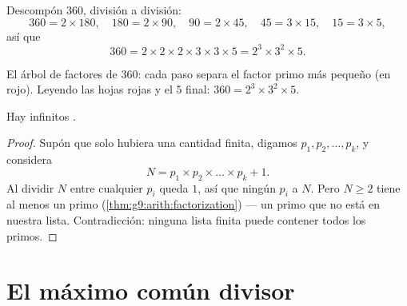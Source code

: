 \begin{example}\label{ex:g9:arith:factorization}
Descompón $360$, división a división:
\[
360 = 2 \times 180, \quad
180 = 2 \times 90, \quad
90 = 2 \times 45, \quad
45 = 3 \times 15, \quad
15 = 3 \times 5,
\]
así que
\[
360 = 2 \times 2 \times 2 \times 3 \times 3 \times 5 = 2^3 \times 3^2
\times 5 .
\]
\end{example}

\begin{omfigure}

{\small El árbol de factores de $360$: cada paso separa el factor primo
más pequeño (en rojo). Leyendo las hojas rojas y el $5$ final:
$360 = 2^3 \times 3^2 \times 5$.}
\end{omfigure}

\begin{theorem}[Euclides]\label{thm:g9:arith:euclid}
Hay infinitos .
\end{theorem}

\begin{proof}
Supón que solo hubiera una cantidad finita, digamos $p_1, p_2, \dots, p_k$, y
considera
\[
N = p_1 \times p_2 \times \dots \times p_k + 1 .
\]
Al dividir $N$ entre cualquier $p_i$ queda  $1$, así que ningún $p_i$  a $N$.
Pero $N \geq 2$ tiene al menos un  primo
(\cref{thm:g9:arith:factorization}) --- un primo que no está en nuestra lista.
Contradicción: ninguna lista finita puede contener todos los primos.
\end{proof}

\section{El máximo común divisor}


